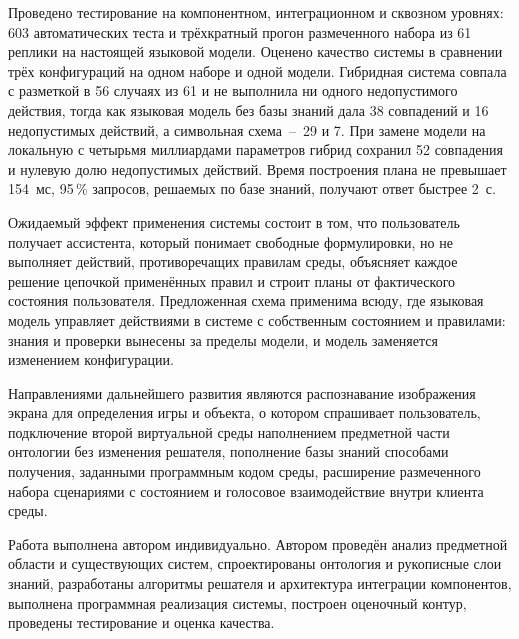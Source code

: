 Проведено тестирование на компонентном, интеграционном и сквозном уровнях: 603
автоматических теста и трёхкратный прогон размеченного набора из 61 реплики на настоящей
языковой модели. Оценено качество системы в сравнении трёх конфигураций на одном наборе и
одной модели. Гибридная система совпала с разметкой в 56 случаях из 61 и не выполнила ни
одного недопустимого действия, тогда как языковая модель без базы знаний дала 38
совпадений и 16 недопустимых действий, а символьная схема~--~29 и 7. При замене модели на
локальную с четырьмя миллиардами параметров гибрид сохранил 52 совпадения и нулевую долю
недопустимых действий. Время построения плана не превышает 154~мс, 95\,\% запросов,
решаемых по базе знаний, получают ответ быстрее 2~с.

Ожидаемый эффект применения системы состоит в том, что пользователь получает ассистента,
который понимает свободные формулировки, но не выполняет действий, противоречащих
правилам среды, объясняет каждое решение цепочкой применённых правил и строит планы от
фактического состояния пользователя. Предложенная схема применима всюду, где языковая
модель управляет действиями в системе с собственным состоянием и правилами: знания и
проверки вынесены за пределы модели, и модель заменяется изменением конфигурации.

Направлениями дальнейшего развития являются распознавание изображения экрана для
определения игры и объекта, о котором спрашивает пользователь, подключение второй
виртуальной среды наполнением предметной части онтологии без изменения решателя,
пополнение базы знаний способами получения, заданными программным кодом среды,
расширение размеченного набора сценариями с состоянием и голосовое взаимодействие
внутри клиента среды.

Работа выполнена автором индивидуально. Автором проведён анализ предметной области и
существующих систем, спроектированы онтология и рукописные слои знаний, разработаны
алгоритмы решателя и архитектура интеграции компонентов, выполнена программная
реализация системы, построен оценочный контур, проведены тестирование и оценка качества.
